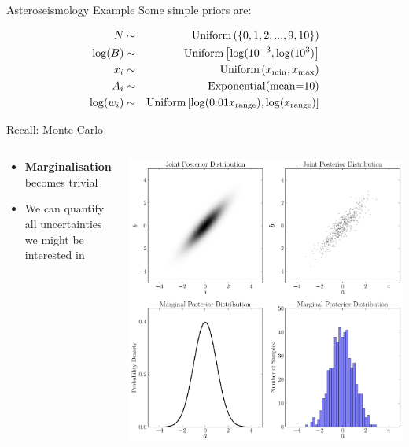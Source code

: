 \begin{frame}[t]{Asteroseismology Example}
Some simple priors are:

\begin{eqnarray*}
N &\sim& \textnormal{Uniform}\left(\{0, 1, 2, ..., 9, 10\}\right)\\
\log(B) &\sim& \textnormal{Uniform}\left[\log(10^{-3}, \log(10^{3})\right]\\
x_i &\sim& \textnormal{Uniform}\left(x_{\rm min}, x_{\rm max}\right)\\
A_i &\sim& \textnormal{Exponential}(\textnormal{mean=10})\\
\log(w_i) &\sim& \textnormal{Uniform}\left[\log(0.01 x_{\rm range}), \log(x_{\rm range})\right]
\end{eqnarray*}

\end{frame}



\begin{frame}[t]{Recall: Monte Carlo}
\begin{columns}[T]
\begin{column}{0.35\textwidth}
  \vspace{20pt}
  \begin{itemize}
  \setlength{\itemsep}{10pt}
  \item {\bf Marginalisation} becomes trivial
  \item We can quantify all uncertainties we might be interested in
  \end{itemize}
\end{column}
\hfill
\begin{column}{0.5\textwidth}
  \hspace{-30pt}
  \includegraphics[scale=0.22]{marginalisation.pdf}
\end{column}

\end{columns}
\end{frame}


